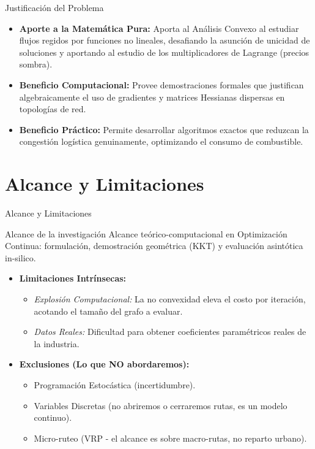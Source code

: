 \documentclass[10pt]{beamer}
\begin{document}
\begin{frame}{Justificación del Problema}
    \begin{itemize}
        \item \textbf{Aporte a la Matemática Pura:} Aporta al Análisis Convexo al estudiar flujos regidos por funciones no lineales, desafiando la asunción de unicidad de soluciones y aportando al estudio de los multiplicadores de Lagrange (precios sombra).
        \item \textbf{Beneficio Computacional:} Provee demostraciones formales que justifican algebraicamente el uso de gradientes y matrices Hessianas dispersas en topologías de red.
        \item \textbf{Beneficio Práctico:} Permite desarrollar algoritmos exactos que reduzcan la congestión logística genuinamente, optimizando el consumo de combustible.
    \end{itemize}
\end{frame}

\section{Alcance y Limitaciones}

\begin{frame}{Alcance y Limitaciones}
    \begin{block}{Alcance de la investigación}
        Alcance teórico-computacional en Optimización Continua: formulación, demostración geométrica (KKT) y evaluación asintótica in-silico.
    \end{block}
    
    \begin{itemize}
        \item \textbf{Limitaciones Intrínsecas:}
        \begin{itemize}
            \item \textit{Explosión Computacional:} La no convexidad eleva el costo por iteración, acotando el tamaño del grafo a evaluar.
            \item \textit{Datos Reales:} Dificultad para obtener coeficientes paramétricos reales de la industria.
        \end{itemize}
        \item \textbf{Exclusiones (Lo que NO abordaremos):}
        \begin{itemize}
            \item Programación Estocástica (incertidumbre).
            \item Variables Discretas (no abriremos o cerraremos rutas, es un modelo continuo).
            \item Micro-ruteo (VRP - el alcance es sobre macro-rutas, no reparto urbano).
        \end{itemize}
    \end{itemize}
\end{frame}
\end{document}
